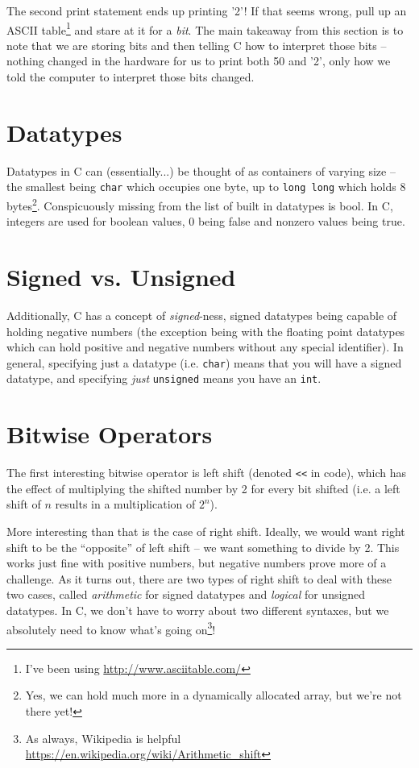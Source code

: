 \documentclass[10pt]{article}
\begin{document}
\noindent The second print statement ends up printing '2'! If that seems wrong, pull up an ASCII table\footnote{I've been using \url{http://www.asciitable.com/}} and stare at it for a \textit{bit}. The main takeaway from this section is to note that we are storing bits and then telling C how to interpret those bits -- nothing changed in the hardware for us to print both 50 and '2', only how we told the computer to interpret those bits changed.



\section*{Datatypes}

Datatypes in C can (essentially...) be thought of as containers of varying size -- the smallest being \texttt{char} which occupies one byte, up to \texttt{long long} which holds 8 bytes\footnote{Yes, we can hold much more in a dynamically allocated array, but we're not there yet!}. Conspicuously missing from the list of built in datatypes is bool. In C, integers are used for boolean values, 0 being false and nonzero values being true.


\section*{Signed vs. Unsigned}

Additionally, C has a concept of \textit{signed}-ness, signed datatypes being capable of holding negative numbers (the exception being with the floating point datatypes which can hold positive and negative numbers without any special identifier). In general, specifying just a datatype (i.e. \texttt{char}) means that you will have a signed datatype, and specifying \textit{just} \texttt{unsigned} means you have an \texttt{int}.


\section*{Bitwise Operators}

The first interesting bitwise operator is left shift (denoted \texttt{<<} in code), which has the effect of multiplying the shifted number by 2 for every bit shifted (i.e. a left shift of $n$ results in a multiplication of $2^n$).


More interesting than that is the case of right shift. Ideally, we would want right shift to be the ``opposite'' of left shift -- we want something to divide by 2. This works just fine with positive numbers, but negative numbers prove more of a challenge. As it turns out, there are two types of right shift to deal with these two cases, called \textit{arithmetic} for signed datatypes and \textit{logical} for unsigned datatypes. In C, we don't have to worry about two different syntaxes, but we absolutely need to know what's going on\footnote{As always, Wikipedia is helpful \url{https://en.wikipedia.org/wiki/Arithmetic_shift}}!
\end{document}
